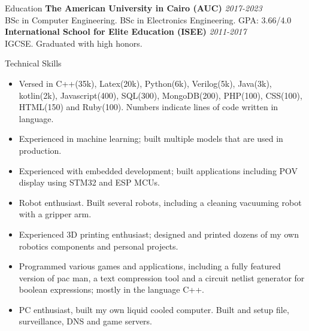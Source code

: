 \documentclass{resume}
\begin{document}
\begin{small}
	
	\begin{rSection}{Education}
		{\bf The American University in Cairo (AUC)} \hfill {\em 2017-2023} \\
		BSc in Computer Engineering. BSc in Electronics Engineering. GPA: 3.66/4.0\\
		{\bf International School for Elite Education (ISEE)} \hfill {\em 2011-2017}\\
		IGCSE. Graduated with high honors.
	\end{rSection}
	
	\begin{rSection}{Technical Skills}
		\begin{itemize}
			\itemsep-0.4em
			\item Versed in C++(35k), Latex(20k), Python(6k), Verilog(5k), Java(3k), kotlin(2k), Javascript(400), SQL(300), MongoDB(200), PHP(100), CSS(100), HTML(150) and Ruby(100). Numbers indicate lines of code written in language.
			\item Experienced in machine learning; built multiple models that are used in production.
			\item Experienced with embedded development; built applications including POV display using STM32 and ESP MCUs.
			\item Robot enthusiast. Built several robots, including a cleaning vacuuming robot with a gripper arm.
			\item Experienced 3D printing enthusiast; designed and printed dozens of my own robotics components and personal projects.
			\item Programmed various games and applications, including a fully featured version of pac man, a text compression tool and a circuit netlist generator for boolean expressions; mostly in the language C++.
			\item PC enthusiast, built my own liquid cooled computer. Built and setup file, surveillance, DNS and game servers.
		\end{itemize}
	\end{rSection}


\end{small}
\end{document}
